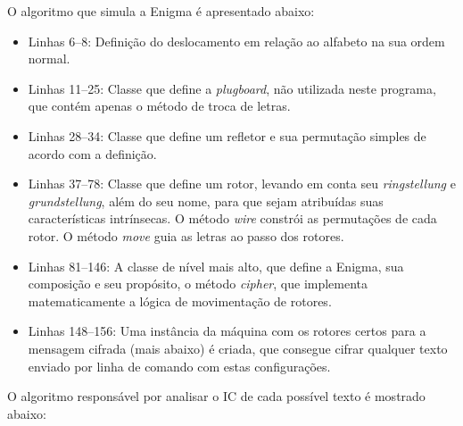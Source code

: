 \documentclass{../sftex/sftex}
\begin{document}
O algoritmo que simula a Enigma é apresentado abaixo:



\begin{itemize}

    \item Linhas 6--8: Definição do deslocamento em relação ao alfabeto na sua
        ordem normal.

    \item Linhas 11--25: Classe que define a \textit{plugboard}, não utilizada
        neste programa, que contém apenas o método de troca de letras.

    \item Linhas 28--34: Classe que define um refletor e sua permutação simples
        de acordo com a definição.

    \item Linhas 37--78: Classe que define um rotor, levando em conta seu
        \textit{ringstellung} e \textit{grundstellung}, além do seu nome, para
        que sejam atribuídas suas características intrínsecas. O método
        \textit{wire} constrói as permutações de cada rotor. O método
        \textit{move} guia as letras ao passo dos rotores.

    \item Linhas 81--146: A classe de nível mais alto, que define a Enigma, sua
        composição e seu propósito, o método \textit{cipher}, que implementa
        matematicamente a lógica de movimentação de rotores.

    \item Linhas 148--156: Uma instância da máquina com os rotores certos para
        a mensagem cifrada (mais abaixo) é criada, que consegue cifrar
        qualquer texto enviado por linha de comando com estas configurações.

\end{itemize}

O algoritmo responsável por analisar o IC de cada possível texto é mostrado
abaixo:


\end{document}
